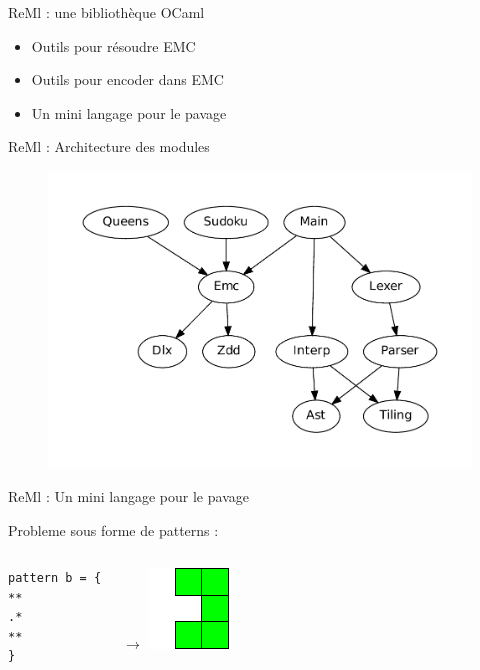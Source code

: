 \documentclass{beamer}
\begin{document}
\begin{frame}{ReMl : une bibliothèque OCaml}
\begin{itemize}
\item Outils pour résoudre EMC
\item Outils pour encoder dans EMC
\item Un mini langage pour le pavage
\end{itemize}
\end{frame}


\begin{frame}{ReMl : Architecture des modules}
\begin{figure}[htp]
\begin{center}
\includegraphics[scale=0.5]{../imports/archi.pdf}
\end{center}
\end{figure}
\end{frame}

\begin{frame}[fragile]{ReMl : Un mini langage pour le pavage}

Probleme sous forme de patterns : 
\begin{columns}
\begin{lstlisting}
pattern b = {
**
.*
**
}
\end{lstlisting}
		$\rightarrow$
\includegraphics[scale=1]{../imports/patron.pdf}
\end{columns}
\end{frame}
\end{document}

